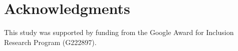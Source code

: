 \documentclass[11pt]{article}
\begin{document}
\section*{Acknowledgments}
This study was supported by funding from the Google Award for Inclusion Research Program (G222897).




\end{document}
